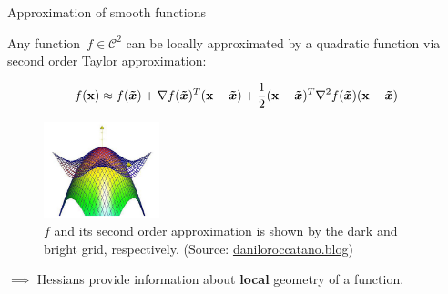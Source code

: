 \documentclass[11pt,compress,t,notes=noshow, xcolor=table]{beamer}
\begin{document}
\begin{vbframe}{Approximation of smooth functions}

Any function~$f \in \mathcal{C}^2$ can be locally approximated by a quadratic function via second order Taylor approximation: 

\vspace*{-0.5\baselineskip}

\begin{equation*}
    f(\mathbf{x}) \approx f(\bm{\tilde{x}}) + \nabla f(\bm{\tilde{x}})^T(\mathbf{x}-\bm{\tilde{x}}) + \frac 12(\mathbf{x}-\bm{\tilde{x}})^T\nabla^2 f(\bm{\tilde{x}})(\mathbf{x}-\bm{\tilde{x}})    
\end{equation*}

\vspace{-0.5\baselineskip}

\begin{figure}
    \includegraphics[width=0.3\textwidth]{figure_man/taylor_2D_quadratic.png}
    \caption*{\footnotesize $f$ and its second order approximation is shown by the dark and bright grid, respectively.
        (Source: \url{daniloroccatano.blog})}
\end{figure}

$\implies$ Hessians provide information about \textbf{local} geometry of a function.

\end{vbframe}
  
\endlecture
\end{document}
